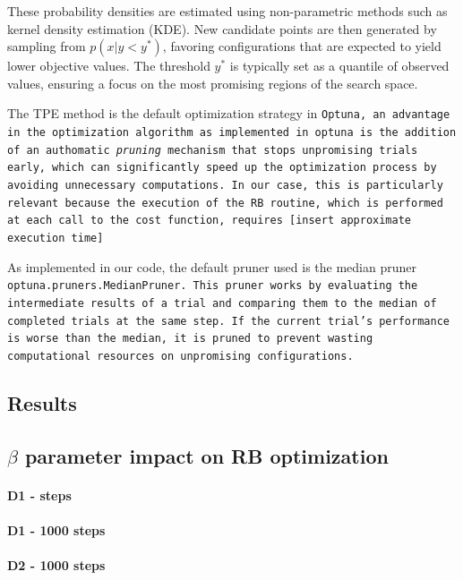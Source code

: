These probability densities are estimated using non-parametric methods such as kernel density estimation (KDE). 
New candidate points are then generated by sampling from $p(x | y < y^*)$, favoring configurations that are expected to yield lower objective values. The threshold $y^*$ is typically set as a quantile of observed values, ensuring a focus on the most promising regions of the search space.

The TPE method is the default optimization strategy in \tt{Optuna}, an advantage in the optimization algorithm as implemented in optuna is the addition of an authomatic \textit{pruning} mechanism that stops  unpromising trials early, which can significantly speed up the optimization process by avoiding unnecessary computations.
In our case, this is particularly relevant because the execution of the RB routine, which is performed at each call to the cost function, requires [insert approximate execution time]

As implemented in our code, the default pruner used is the median pruner \tt{optuna.pruners.MedianPruner}. 
This pruner works by evaluating the intermediate results of a trial and comparing them to the median of completed trials at the same step. 
If the current trial's performance is worse than the median, it is pruned to prevent wasting computational resources on unpromising configurations. 

\subsection{Results}

\subsection{$\beta$ parameter impact on RB optimization}

\paragraph{D1 - steps}

\paragraph{D1 - 1000 steps}

\paragraph{D2 - 1000 steps}



